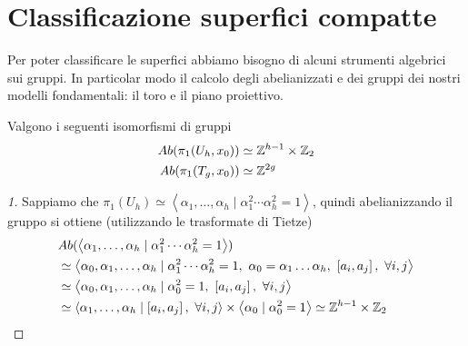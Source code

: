 \section{Classificazione superfici compatte}

Per poter classificare le superfici abbiamo bisogno di alcuni strumenti algebrici sui gruppi. In particolar modo il calcolo degli abelianizzati e dei gruppi dei nostri modelli fondamentali: il toro e il piano proiettivo.

\begin{lemma}
	\label{lemm:abel_torus_proj}
	Valgono i seguenti isomorfismi di gruppi
	\begin{equation}
	\begin{aligned}
	 Ab(\pi_1(U_h, x_0)) & \simeq \mathbb{Z}^{h-1} \times \mathbb{Z}_2 \\
	 Ab(\pi_1(T_g, x_0)) & \simeq \mathbb{Z}^{2g}
	\end{aligned}
	\end{equation}  
\end{lemma}
\begin{proof}[1]
	Sappiamo che $\pi_1(U_h) \simeq \left\langle \alpha_1, \dots, \alpha_h \mid \alpha^2_1 \cdots \alpha^2_h = 1\right\rangle$, quindi abelianizzando il gruppo si ottiene (utilizzando le trasformate di Tietze)
	\begin{equation}
	\begin{aligned}
		& Ab( \left\langle \alpha_1, \dots, \alpha_h \mid \alpha^2_1 \cdots \alpha^2_h = 1\right\rangle) \\
		& \simeq \left\langle \alpha_0, \alpha_1, \dots, \alpha_h \mid \alpha^2_1 \cdots \alpha^2_h = 1,\ \alpha_0 = \alpha_1 \dots \alpha_h,\ \left[a_i, a_j\right],\ \forall i,j \right\rangle\\
		& \simeq \left\langle \alpha_0, \alpha_1, \dots, \alpha_h \mid \alpha^2_0 = 1,\ \left[a_i, a_j\right],\ \forall i,j \right\rangle \\
		& \simeq \left\langle \alpha_1, \dots, \alpha_h \mid \left[a_i, a_j\right],\ \forall i,j \right\rangle \times \left\langle \alpha_0 \mid \alpha^2_0 = 1\right\rangle \simeq \mathbb{Z}^{h-1} \times \mathbb{Z}_2 
	\end{aligned}
	\end{equation}
\end{proof}
